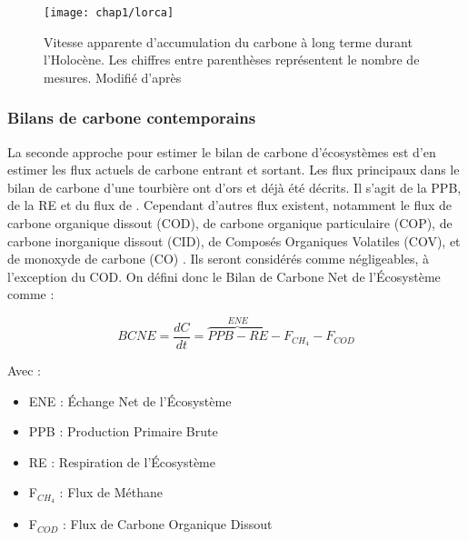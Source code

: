 \begin{figure}
\centering
\texttt{[image: chap1/lorca]}
\caption{Vitesse apparente d'accumulation du carbone à long terme durant l'Holocène. Les chiffres entre parenthèses représentent le nombre de mesures. Modifié d'après \citet{yu2009}}
\label{fig:lorca}
\end{figure}

\subsubsection{Bilans de carbone contemporains}

La seconde approche pour estimer le bilan de carbone d'écosystèmes est d'en estimer les flux actuels de carbone entrant et sortant.
Les flux principaux dans le bilan de carbone d'une tourbière ont d'ors et déjà été décrits.
Il s'agit de la PPB, de la RE et du flux de \chh.
Cependant d'autres flux existent, notamment le flux de carbone organique dissout (COD), de carbone organique particulaire (COP), de carbone inorganique dissout (CID), de Composés Organiques Volatiles (COV), et de monoxyde de carbone (CO) \citep{chapin2006}.
Ils seront considérés comme négligeables, à l'exception du COD.
On défini donc le Bilan de Carbone Net de l'Écosystème comme :

\begin{equation}
BCNE=\frac{dC}{dt}=\overbrace{PPB - RE}^{ENE} - F_{CH_{4}} - F_{COD}
\label{bdc}
\end{equation}

Avec : 
\begin{itemize}
\item ENE : Échange Net de l'Écosystème
\item PPB : Production Primaire Brute
\item RE : Respiration de l'Écosystème
\item F$_{CH_{4}}$ : Flux de Méthane
\item F$_{COD}$ : Flux de Carbone Organique Dissout
\end{itemize}

